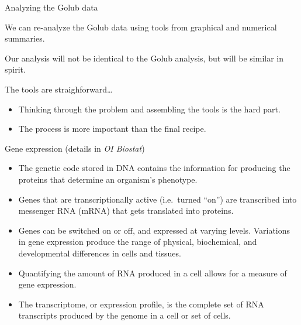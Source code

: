 \documentclass[
  ignorenonframetext,
]{beamer}
\begin{document}
\begin{frame}{Analyzing the Golub data}
\protect\hypertarget{analyzing-the-golub-data}{}

We can re-analyze the Golub data using tools from graphical and
numerical summaries.

Our analysis will not be identical to the Golub analysis, but will be
similar in spirit.

The tools are straighforward\ldots   

\begin{itemize}
\item
  Thinking through the problem and assembling the tools is the hard
  part.
\item
  The process is more important than the final recipe.
\end{itemize}

\end{frame}

\begin{frame}{Gene expression (details in \emph{OI Biostat})}
\protect\hypertarget{gene-expression-details-in-oi-biostat}{}

\small

\begin{itemize}
\item
  The genetic code stored in DNA contains the information for producing
  the proteins that determine an organism's phenotype.
\item
  Genes that are transcriptionally active (i.e.~turned ``on'') are
  transcribed into messenger RNA (mRNA) that gets translated into
  proteins.
\item
  Genes can be switched on or off, and expressed at varying levels.
  Variations in gene expression produce the range of physical,
  biochemical, and developmental differences in cells and tissues.
\item
  Quantifying the amount of RNA produced in a cell allows for a measure
  of gene expression.
\item
  The transcriptome, or expression profile, is the complete set of RNA
  transcripts produced by the genome in a cell or set of cells.
\end{itemize}

\end{frame}
\end{document}
